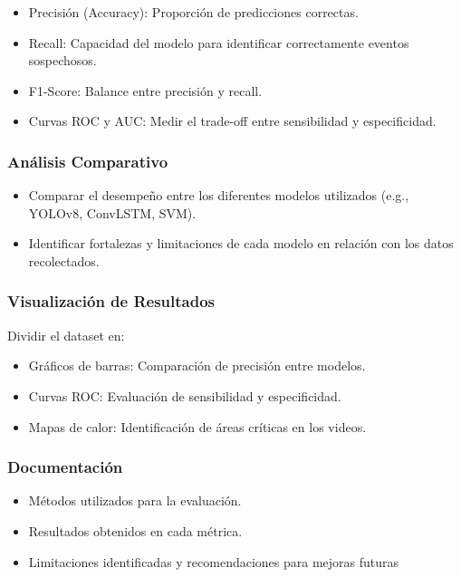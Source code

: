 \begin{itemize}
    \item Precisión (Accuracy): Proporción de predicciones correctas.
    \item Recall: Capacidad del modelo para identificar correctamente eventos sospechosos.
    \item F1-Score: Balance entre precisión y recall.
    \item Curvas ROC y AUC: Medir el trade-off entre sensibilidad y especificidad.
\end{itemize}



\subsubsection{Análisis Comparativo}
\begin{itemize}
    \item Comparar el desempeño entre los diferentes modelos utilizados (e.g., YOLOv8, ConvLSTM, SVM).
    \item Identificar fortalezas y limitaciones de cada modelo en relación con los datos recolectados.
\end{itemize}



\subsubsection{Visualización de Resultados}
Dividir el dataset en:
\begin{itemize}
    \item Gráficos de barras: Comparación de precisión entre modelos.
    \item Curvas ROC: Evaluación de sensibilidad y especificidad.
    \item Mapas de calor: Identificación de áreas críticas en los videos.
\end{itemize}

\subsubsection{Documentación}
\begin{itemize}
    \item Métodos utilizados para la evaluación.
    \item Resultados obtenidos en cada métrica.
    \item Limitaciones identificadas y recomendaciones para mejoras futuras
\end{itemize}


